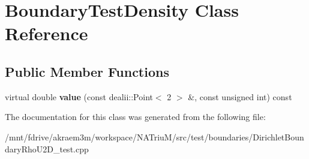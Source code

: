 \hypertarget{classBoundaryTestDensity}{
\section{BoundaryTestDensity Class Reference}
\label{classBoundaryTestDensity}
}
\subsection*{Public Member Functions}
\begin{DoxyCompactItemize}
\item 
\hypertarget{classBoundaryTestDensity_ad53be1f68115e8645e15ee35a31f86c0}{
virtual double {\bfseries value} (const dealii::Point$<$ 2 $>$ \&, const unsigned int) const }
\label{classBoundaryTestDensity_ad53be1f68115e8645e15ee35a31f86c0}

\end{DoxyCompactItemize}


The documentation for this class was generated from the following file:\begin{DoxyCompactItemize}
\item 
/mnt/fdrive/akraem3m/workspace/NATriuM/src/test/boundaries/DirichletBoundaryRhoU2D\_\-test.cpp\end{DoxyCompactItemize}
